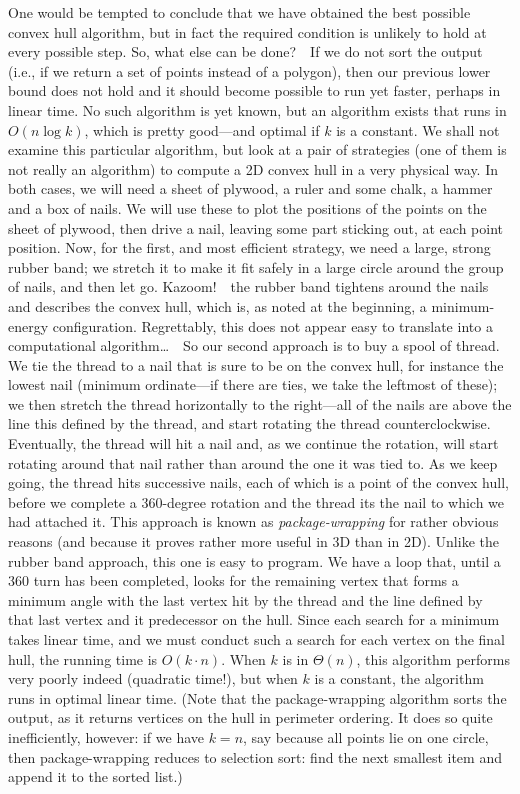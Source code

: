 \documentclass[11pt]{article}
\begin{document}
One would be tempted to conclude that we have obtained the best possible
convex hull algorithm, but in fact the required condition is unlikely
to hold at every possible step.   So, what else can be done?\ \ If we
do not sort the output (i.e., if we return a set of points instead of a
polygon), then our previous lower bound does not hold and it should
become possible to run yet faster, perhaps in linear time.  No such algorithm
is yet known, but an algorithm exists that runs in $O(n\log k)$, which is
pretty good---and optimal if $k$ is a constant.
We shall not examine this particular algorithm, but look at a pair of
strategies (one of them is not really an algorithm) to compute a 2D
convex hull in a very physical way.  In both cases, we will need a sheet
of plywood, a ruler and some chalk, a hammer and a box of nails.   We will
use these to plot the positions of the points on the sheet of plywood, then
drive a nail, leaving some part sticking out, at each point position.
Now, for the first, and most efficient strategy, we need a large, strong
rubber band; we stretch it to make it fit safely in a large circle around
the group of nails, and then let go.  Kazoom!\ \ the rubber band tightens
around the nails and describes the convex hull, which is, as noted at the
beginning, a minimum-energy configuration.   Regrettably, this does not
appear easy to translate into a computational algorithm\dots\ \ So our second
approach is to buy a spool of thread.  We tie the thread to a nail that is
sure to be on the convex hull, for instance the lowest nail (minimum
ordinate---if there are ties, we take the leftmost of these); we then stretch
the thread horizontally to the right---all of the nails are above the line
this defined by the thread, and start rotating the thread counterclockwise.
Eventually, the thread will hit a nail and, as we continue the rotation, will
start rotating around that nail rather than around the one it was tied to.
As we keep going, the thread hits successive nails, each of which is a point
of the convex hull, before we complete a 360-degree rotation and the thread
its the nail to which we had attached it.  This approach is known as
\emph{package-wrapping} for rather obvious reasons (and because it proves
rather more useful in 3D than in 2D).  Unlike the rubber band approach,
this one is easy to program.  We have a loop that, until a 360 turn has
been completed, looks for the remaining vertex that forms a minimum angle
with the last vertex hit by the thread and the line defined by that last
vertex and it predecessor on the hull.  Since each search for a minimum takes
linear time, and we must conduct such a search for each vertex on the
final hull, the running time is $O(k\cdot n)$.  When $k$ is in $\Theta(n)$,
this algorithm performs very poorly indeed (quadratic time!), but when $k$
is a constant, the algorithm runs in optimal linear time.  (Note that the
package-wrapping algorithm sorts the output, as it returns vertices on
the hull in perimeter ordering.  It does so quite inefficiently, however:
if we have $k=n$, say because all points lie on one circle, then
package-wrapping reduces to selection sort: find the next smallest item
and append it to the sorted list.)
\end{document}

